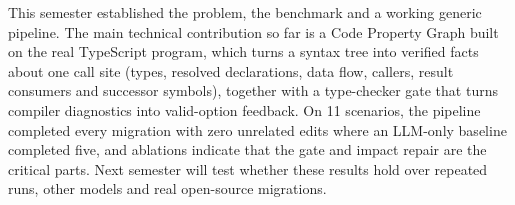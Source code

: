 \documentclass[11pt,a4paper]{article}
\begin{document}
This semester established the problem, the benchmark and a working generic pipeline. The
main technical contribution so far is a Code Property Graph built on the real TypeScript
program, which turns a syntax tree into verified facts about one call site (types, resolved
declarations, data flow, callers, result consumers and successor symbols), together with a
type-checker gate that turns compiler diagnostics into valid-option feedback. On 11 scenarios,
the pipeline completed every migration with zero unrelated edits where an LLM-only baseline
completed five, and ablations indicate that the gate and impact repair are the critical parts.
Next semester will test whether these results hold over repeated runs, other models and real
open-source migrations.



\end{document}
